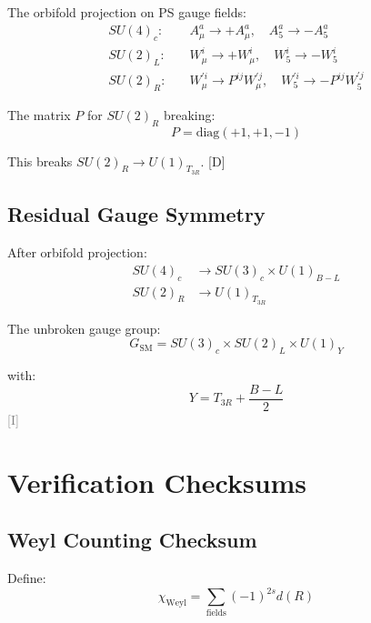 \documentclass[11pt,a4paper]{article}
\newcommand{\tagD}{\textcolor{blue!70!black}{[D]}}
\newcommand{\tagI}{\textcolor{gray}{[I]}}
\begin{document}
The orbifold projection on PS gauge fields:
\begin{align}
\label{eq:orb-su4}
SU(4)_c: \quad & A_\mu^a \to +A_\mu^a, \quad A_5^a \to -A_5^a \\
\label{eq:orb-su2L}
SU(2)_L: \quad & W_\mu^i \to +W_\mu^i, \quad W_5^i \to -W_5^i \\
\label{eq:orb-su2R}
SU(2)_R: \quad & W_\mu^{\prime i} \to P^{ij} W_\mu^{\prime j}, \quad W_5^{\prime i} \to -P^{ij} W_5^{\prime j}
\end{align}

The matrix $P$ for $SU(2)_R$ breaking:
\begin{equation}
\label{eq:P-matrix}
P = \text{diag}(+1, +1, -1)
\end{equation}

This breaks $SU(2)_R \to U(1)_{T_{3R}}$. \tagD

\subsection{Residual Gauge Symmetry}

After orbifold projection:
\begin{align}
\label{eq:residual-4c}
SU(4)_c &\to SU(3)_c \times U(1)_{B-L} \\
\label{eq:residual-2R}
SU(2)_R &\to U(1)_{T_{3R}}
\end{align}

The unbroken gauge group:
\begin{equation}
\label{eq:unbroken}
G_{\text{SM}} = SU(3)_c \times SU(2)_L \times U(1)_Y
\end{equation}

with:
\begin{equation}
\label{eq:Y-orbifold}
Y = T_{3R} + \frac{B-L}{2}
\end{equation}
\tagI

\section{Verification Checksums}
\label{app:checksums}

\subsection{Weyl Counting Checksum}

Define:
\begin{equation}
\label{eq:checksum-weyl}
\chi_{\text{Weyl}} = \sum_{\text{fields}} (-1)^{2s} d(R)
\end{equation}
\end{document}
